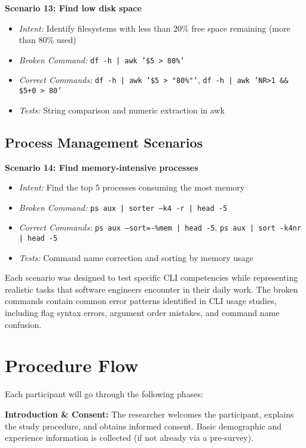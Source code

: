 \textbf{Scenario 13: Find low disk space}
\begin{itemize}
	\item \textit{Intent:} Identify filesystems with less than 20\% free space remaining (more than 80\% used)
	\item \textit{Broken Command:} \texttt{df -h | awk '\$5 > 80\%'}
	\item \textit{Correct Commands:} \texttt{df -h | awk '\$5 > "80\%"'}, \texttt{df -h | awk 'NR>1 \&\& \$5+0 > 80'}
	\item \textit{Tests:} String comparison and numeric extraction in awk
\end{itemize}

\subsection{Process Management Scenarios}

\textbf{Scenario 14: Find memory-intensive processes}
\begin{itemize}
	\item \textit{Intent:} Find the top 5 processes consuming the most memory
	\item \textit{Broken Command:} \texttt{ps aux | sorter --k4 -r | head -5}
	\item \textit{Correct Commands:} \texttt{ps aux --sort=-\%mem | head -5}, \texttt{ps aux | sort -k4nr | head -5}
	\item \textit{Tests:} Command name correction and sorting by memory usage
\end{itemize}

Each scenario was designed to test specific CLI competencies while representing realistic tasks that software engineers encounter in their daily work. The broken commands contain common error patterns identified in CLI usage studies, including flag syntax errors, argument order mistakes, and command name confusion.

\section{Procedure Flow}

Each participant will go through the following phases:

\textbf{Introduction \& Consent:} The researcher welcomes the participant, explains the study procedure, and obtains informed consent. Basic demographic and experience information is collected (if not already via a pre-survey).

